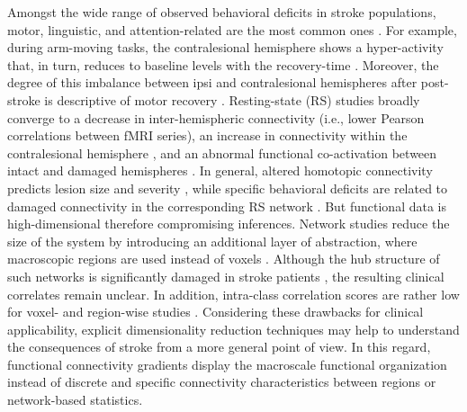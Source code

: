 \documentclass[fleqn,10pt]{wlscirep}
\begin{document}
Amongst the wide range of observed behavioral deficits in stroke populations, motor, linguistic, and attention-related are the most common ones \citep{he2007breakdown}. For example, during arm-moving tasks, the contralesional hemisphere shows a hyper-activity that, in turn, reduces to baseline levels with the recovery-time \citep{rehme2011role}. Moreover, the degree of this imbalance between ipsi and contralesional hemispheres after post-stroke is descriptive of motor recovery \citep{dodd2017role}. Resting-state (RS) studies broadly converge to a decrease in inter-hemispheric connectivity (i.e., lower Pearson correlations between fMRI series), an increase in connectivity within the contralesional hemisphere \citep{new2015altered,yourganov2021effect}, and an abnormal functional co-activation between intact and damaged hemispheres \citep{carter2010resting}. In general, altered homotopic connectivity predicts lesion size and severity \citep{urbin2014resting,tang2016decreased}, while specific behavioral deficits are related to damaged connectivity in the corresponding RS network \citep{corbetta2002control,carter2010resting}. But functional data is high-dimensional therefore compromising inferences. Network studies reduce the size of the system by introducing an additional layer of abstraction, where macroscopic regions are used instead of voxels \citep{Schaefer_2017}. Although the hub structure of such networks is significantly damaged in stroke patients \citep{gratton2012focal,zhu2017disrupted}, the resulting clinical correlates remain unclear. In addition, intra-class correlation scores are rather low for voxel- and region-wise studies \citep{noble2021guide}. Considering these drawbacks for clinical applicability, explicit dimensionality reduction techniques may help to understand the consequences of stroke from a more general point of view. In this regard, functional connectivity gradients \citep{margulies2016situating} display the macroscale functional organization instead of discrete and specific connectivity characteristics between regions or network-based statistics. 
\end{document}
